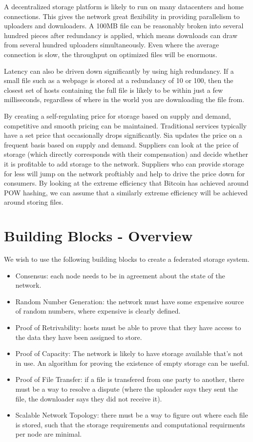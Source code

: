 \documentclass[twocolumn]{article}
\begin{document}
A decentralized storage platform is likely to run on many datacenters and home connections.
This gives the network great flexibility in providing parallelism to uploaders and downloaders.
A 100MB file can be reasonably broken into several hundred pieces after redundancy is applied, which means downloads can draw from several hundred uploaders simultaneously.
Even where the average connection is slow, the throughput on optimized files will be enormous.

Latency can also be driven down significantly by using high redundancy.
If a small file such as a webpage is stored at a redundancy of 10 or 100, then the closest set of hosts containing the full file is likely to be within just a few milliseconds, regardless of where in the world you are downloading the file from.

By creating a self-regulating price for storage based on supply and demand, competitive and smooth pricing can be maintained.
Traditional services typically have a set price that occasionally drops significantly.
Sia updates the price on a frequent basis based on supply and demand.
Suppliers can look at the price of storage (which directly corresponds with their compensation) and decide whether it is profitable to add storage to the network.
Suppliers who can provide storage for less will jump on the network proftiably and help to drive the price down for consumers.
By looking at the extreme efficiency that Bitcoin has achieved around POW hashing, we can assume that a similarly extreme efficiency will be achieved around storing files.

\section{Building Blocks - Overview}
We wish to use the following building blocks to create a federated storage system.
\begin{itemize}
	\item Consensus: each node needs to be in agreement about the state of the network.
	\item Random Number Generation: the network must have some expensive source of random numbers, where expensive is clearly defined.
	\item Proof of Retrivability: hosts must be able to prove that they have access to the data they have been assigned to store.
	\item Proof of Capacity: The network is likely to have storage available that's not in use. An algorithm for proving the existence of empty storage can be useful.
	\item Proof of File Transfer: if a file is transfered from one party to another, there must be a way to resolve a dispute (where the uploader says they sent the file, the downloader says they did not receive it).
	\item Scalable Network Topology: there must be a way to figure out where each file is stored, such that the storage requirements and computational requirments per node are minimal.
\end{itemize}
\end{document}

